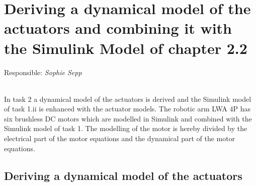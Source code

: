 \chapter{Deriving a dynamical model of the actuators and combining it with the Simulink Model of chapter 2.2}\label{chapter:2}
\vspace{-0.25cm}
Responsible: \textit{Sophie Sepp}


\ \\

In task 2 a dynamical model of the actuators is derived and the Simulink model of task 1.ii is enhanced with the actuator models. The robotic arm LWA 4P has six brushless DC motors which are modelled in Simulink and combined with the Simulink model of task 1. The modelling of the motor is hereby divided by the electrical part of the motor equations and the dynamical part of the motor equations.

\section{Deriving a dynamical model of the actuators }


